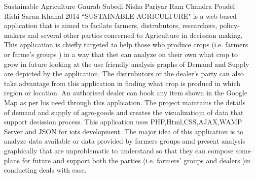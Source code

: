  \begin{conf-abstract}[]
{Sustainable Agriculture}
{ 
Gaurab Subedi 
Nisha Pariyar
Ram Chandra Poudel
Rishi Saran Khanal
}
{2014}
``SUSTAINABLE AGRICULTURE" is a web based application that is aimed to facilate farmers, distrubutors, researchers, policy-makers and several other parties concerned to Agriculture in decission making. This application is chiefly targeted to help those who produce crops (i.e. farmers or farme's groups ) in a way that thet can analyze on their own what crop to grow in future looking at the use friendly analysis graphs of Demand and Supply are depicted by the application. The distrubutors or the dealer's party can also take advantage from this application in finding what crop is producd in which region or location. An authorised dealer can book any item shown in the Google Map as per his need through this application. The project maintains the details of demand and supply of agro-goods and creates the visualizatiojn of data that support decission process. This application uses PHP,Html,CSS,AJAX,WAMP Server and JSON for iots development. The major idea of this application is to analyze data available or data provided by farmers groups amd present analysis graphically that are unproblematic to understand so that they can compose some plans for future and support both the parties (i.e. farmers' groups and dealers )in conducting deals with ease.
  \end{conf-abstract}